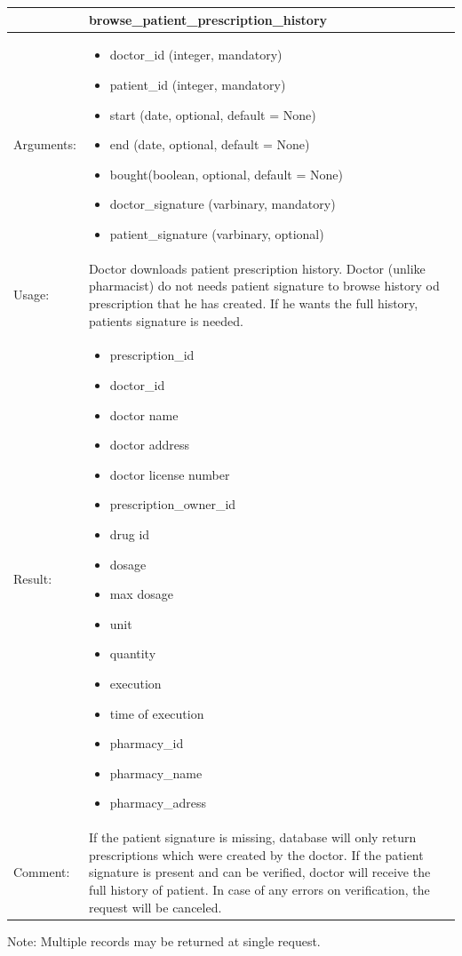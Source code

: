     \begin{longtable}{| p{6cm} | p{7.75cm} |}
    \hline
     & browse\_patient\_prescription\_history \\ \hline
    Arguments: &  \begin{itemize}
    	\item doctor\_id (integer, mandatory)
		\item patient\_id (integer, mandatory)
		\item start (date, optional, default = None)
		\item end (date, optional, default = None)
		\item bought(boolean, optional, default = None)
		\item doctor\_signature (varbinary, mandatory)
		\item patient\_signature (varbinary, optional)

	\end{itemize}     \\ \hline
    Usage: & Doctor downloads patient prescription history. Doctor (unlike pharmacist) do not needs patient signature to browse history od prescription that he has created. If he wants the full history, patients signature is needed. \\ \hline
    Result: & \begin{itemize}
    	\item prescription\_id
    	\item doctor\_id
    	\item doctor name
    	\item doctor address
    	\item doctor license number
    	\item prescription\_owner\_id
    	\item drug id
    	\item dosage
    	\item max dosage
    	\item unit
    	\item quantity
    	\item execution
    	\item time of execution
    	\item pharmacy\_id
    	\item pharmacy\_name
    	\item pharmacy\_adress
	\end{itemize}     \\ \hline
	Comment: & If the patient signature is missing, database will only return prescriptions which were created by the doctor. If the patient signature is present and can be verified, doctor will receive the full history of patient. In case of any errors on verification, the request will be canceled. \\ \hline
    \end{longtable}
Note: Multiple records may be returned at single request.


